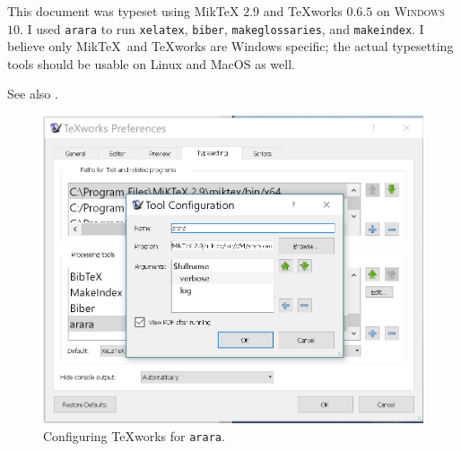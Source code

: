 
This document was typeset using Mik\TeX{} $2.9$ \cite{Schenk:2017:Miktex} 
and {\TeX}works $0.6.5$ \cite{KewLoffler:2017:Texworks} 
on \textsc{Windows} $10$. 
I used \texttt{arara} \cite{CeredaEtAl:2021:Arara} 
to run \texttt{xelatex}, \texttt{biber}, \texttt{makeglossaries},  and
\texttt{makeindex}.
I believe only Mik\TeX\  and {\TeX}works are Windows specific; 
the actual typesetting tools should be usable on Linux and MacOS as well.

See also \cite{Talbot:2012:LatexNovices,Talbot:2013:LatexPhD}.

\begin{figure}[htbp]
\centering
\includegraphics[scale=0.5]{../figs/arara.png}
\caption{Configuring {\TeX}works for \texttt{arara}.}
\label{fig:arara}
\end{figure}
\vfill